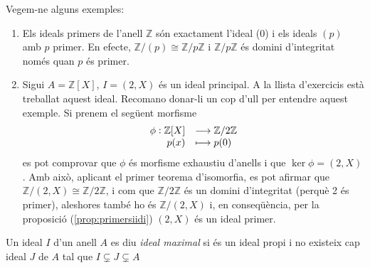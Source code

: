 \documentclass[../main.tex]{subfiles}
\begin{document}
\begin{ej}
Vegem-ne alguns exemples:
\begin{enumerate}
    \item Els ideals primers de l'anell $\mathbb{Z}$ són exactament l'ideal (0) i els ideals $(p)$ amb $p$ primer. En efecte, $\mathbb{Z}/(p)\cong \mathbb{Z}/p\mathbb{Z}$ i $\mathbb{Z}/p\mathbb{Z}$ és domini d'integritat només quan $p$ és primer.
    
    \item Sigui $A = \mathbb{Z}[X]$, $I = (2,X)$ és un ideal principal. A la llista d'exercicis està treballat aquest ideal. Recomano donar-li un cop d'ull per entendre aquest exemple. Si prenem el següent morfisme
    \begin{equation}
        \notag
        \begin{array}{rl}
            \phi:\mathbb{Z}[X] & \longrightarrow\mathbb{Z}/2\mathbb{Z} \\
            p(x) & \longmapsto p(0)
        \end{array}
    \end{equation}
    es pot comprovar que $\phi$ és morfisme exhaustiu d'anells i que $\ker\phi = (2,X)$. Amb això, aplicant el primer teorema d'isomorfia, es pot afirmar que $\mathbb{Z}/(2,X)\cong\mathbb{Z}/2\mathbb{Z}$, i com que $\mathbb{Z}/2\mathbb{Z}$ és un domini d'integritat (perquè 2 és primer), aleshores també ho és $\mathbb{Z}/(2,X)$ i, en conseqüència, per la proposició (\ref{prop:primersiidi}) $(2,X)$ és un ideal primer.
\end{enumerate}
\end{ej}

\begin{defi}
\label{def:idealmaximal} Un ideal $I$ d'un anell $A$ es diu \textit{ideal maximal} si és un ideal propi i no existeix cap ideal $J$ de $A$ tal que $I\varsubsetneq J\varsubsetneq A$
\end{defi}
\end{document}
